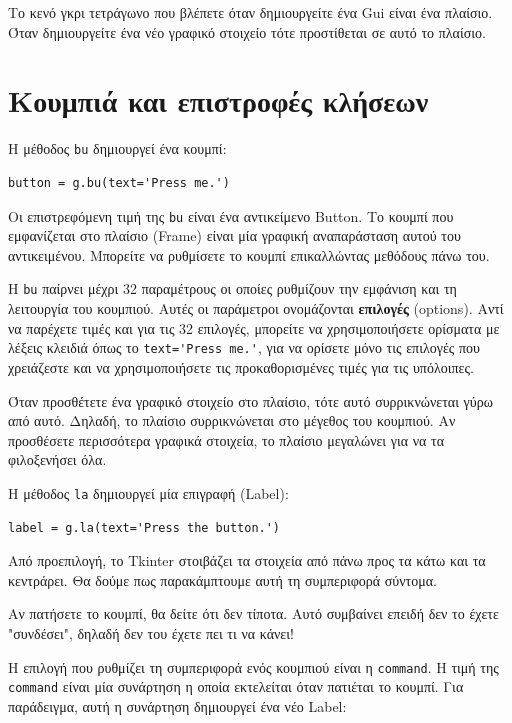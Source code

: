 \documentclass[10pt]{book}
\begin{document}
Το κενό γκρι τετράγωνο που βλέπετε όταν δημιουργείτε ένα Gui είναι ένα πλαίσιο.  
Όταν δημιουργείτε ένα νέο γραφικό στοιχείο τότε προστίθεται σε αυτό το πλαίσιο.



\section{Κουμπιά και επιστροφές κλήσεων}

Η μέθοδος {\tt bu} δημιουργεί ένα κουμπί:

\begin{verbatim}
button = g.bu(text='Press me.')
\end{verbatim}
%
Οι επιστρεφόμενη τιμή της {\tt bu} είναι ένα αντικείμενο Button.   
Το κουμπί που εμφανίζεται στο πλαίσιο (Frame) είναι μία γραφική αναπαράσταση 
αυτού του αντικειμένου.  Μπορείτε να ρυθμίσετε το κουμπί επικαλλώντας μεθόδους πάνω του.

Η {\tt bu} παίρνει μέχρι 32 παραμέτρους οι οποίες ρυθμίζουν την εμφάνιση και τη λειτουργία 
του κουμπιού.  Αυτές οι παράμετροι ονομάζονται {\bf επιλογές} (options).  Αντί να παρέχετε 
τιμές και για τις 32 επιλογές, μπορείτε να χρησιμοποιήσετε ορίσματα με λέξεις 
κλειδιά όπως το \verb"text='Press me.'", για να ορίσετε μόνο τις επιλογές που 
χρειάζεστε και να χρησιμοποιήσετε τις προκαθορισμένες τιμές για τις υπόλοιπες.

Όταν προσθέτετε ένα γραφικό στοιχείο στο πλαίσιο, τότε αυτό συρρικνώνεται γύρω από αυτό.  
Δηλαδή, το πλαίσιο συρρικνώνεται στο μέγεθος του κουμπιού.  Αν προσθέσετε περισσότερα 
γραφικά στοιχεία, το πλαίσιο μεγαλώνει για να τα φιλοξενήσει όλα.

Η μέθοδος {\tt la} δημιουργεί μία επιγραφή (Label):

\begin{verbatim}
label = g.la(text='Press the button.')
\end{verbatim}
%
Από προεπιλογή, το Tkinter στοιβάζει τα στοιχεία από πάνω προς τα κάτω και 
τα κεντράρει.  Θα δούμε πως παρακάμπτουμε αυτή τη συμπεριφορά σύντομα.

Αν πατήσετε το κουμπί, θα δείτε ότι δεν τίποτα. Αυτό συμβαίνει επειδή δεν το έχετε
"συνδέσει", δηλαδή δεν του έχετε πει τι να κάνει!

Η επιλογή που ρυθμίζει τη συμπεριφορά ενός κουμπιού είναι η {\tt command}. 
Η τιμή της {\tt command} είναι μία συνάρτηση η οποία εκτελείται όταν πατιέται το κουμπί.
Για παράδειγμα, αυτή η συνάρτηση δημιουργεί ένα νέο Label:
\end{document}
